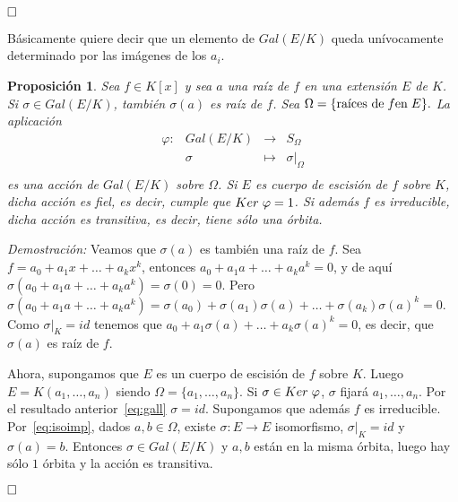 \documentclass[12pt]{article}
\newtheorem{proposition}[theorem]{Proposición}
\begin{document}
$\hfill \square$

Básicamente quiere decir que un elemento de $Gal(E/K)$ queda unívocamente determinado por las imágenes de los $a_{i}$.

\begin{proposition}\label{eq:accgal} Sea $f \in K[x]$ y sea $a$ una raíz de $f$ en una extensión $E$ de $K$. Si $\sigma \in Gal(E/K)$, también $\sigma (a)$ es raíz de $f$. Sea $\Omega = \lbrace \text{raíces de} \hspace{0.1cm} f \text{en} \hspace{0.1cm} E \rbrace. $ La aplicación  $$\begin{array}{rccl}
\varphi \colon &Gal(E/K)&\longrightarrow &S_{\Omega} \\
&\sigma& \longmapsto &\left.\sigma \right|_\Omega \\
\end{array}
$$ es una acción de $Gal(E/K)$ sobre $\Omega$. Si $E$ es cuerpo de escisión de $f$ sobre $K$, dicha acción es fiel, es decir, cumple que $Ker \hspace{0.1cm} \varphi = 1$. Si además $f$ es irreducible, dicha acción es transitiva, es decir, tiene sólo una órbita.
\end{proposition}
\emph{Demostración: }
Veamos que $\sigma(a)$ es también una raíz de $f$. Sea $f = a_{0}+a_{1}x+ \ldots + a_{k}x^{k}$, entonces $a_{0}+a_{1}a+ \ldots + a_{k}a^{k} =0$, y de aquí $\sigma(a_{0}+a_{1}a+ \ldots + a_{k}a^{k}) =\sigma(0) = 0$. Pero  $\sigma(a_{0}+a_{1}a+ \ldots + a_{k}a^{k}) =  \sigma(a_{0})+\sigma(a_{1})\sigma(a)+ \ldots + \sigma(a_{k})\sigma(a)^{k} = 0$. Como $\left.\sigma \right|_K = id$ tenemos que $a_{0}+a_{1}\sigma(a)+ \ldots + a_{k}\sigma(a)^{k} = 0$, es decir, que $\sigma(a)$ es raíz de $f$.

Ahora, supongamos que $E$ es un cuerpo de escisión de $f$ sobre $K$. Luego $E = K(a_{1}, \ldots, a_{n})$ siendo $\Omega = \lbrace a_{1}, \ldots, a_{n} \rbrace$. Si $\sigma \in Ker \hspace{0.1cm} \varphi$, $\sigma$ fijará $a_{1}, \ldots, a_{n}$. Por el resultado anterior~\ref{eq:gall} $\sigma = id$. Supongamos que además $f$ es irreducible. Por~\ref{eq:isoimp}, dados $a,b \in \Omega$, existe $\sigma \colon E \longrightarrow E$ isomorfismo, $\left.\sigma \right|_K = id$ y $\sigma (a) = b$. Entonces $\sigma \in Gal(E/K)$ y $a,b$ están en la misma órbita, luego hay sólo $1$ órbita y la acción es transitiva.

$\hfill \square$
\end{document}
